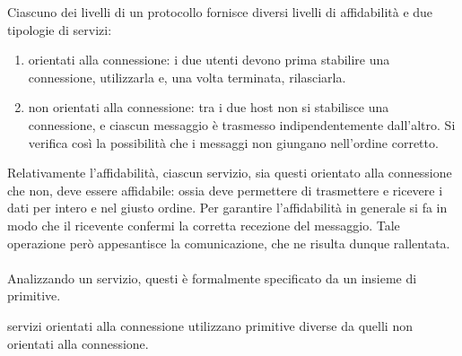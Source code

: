 \documentclass{subfiles}
\begin{document}
Ciascuno dei livelli di un protocollo fornisce diversi livelli di affidabilità e due tipologie di servizi:
\begin{enumerate}
    \item orientati alla connessione: i due utenti devono prima stabilire una connessione, utilizzarla e, una volta terminata, rilasciarla.

    \item non orientati alla connessione: tra i due host non si stabilisce una connessione, e ciascun messaggio è trasmesso indipendentemente dall'altro.
          Si verifica così la possibilità che i messaggi non giungano nell'ordine corretto.
\end{enumerate}

Relativamente l'affidabilità, ciascun servizio, sia questi orientato alla connessione che non, deve essere affidabile:
ossia deve permettere di trasmettere e ricevere i dati per intero e nel giusto ordine.
Per garantire l'affidabilità in generale si fa in modo che il ricevente confermi la corretta recezione del messaggio.
Tale operazione però appesantisce la comunicazione, che ne risulta dunque rallentata.
\\ \\
Analizzando un servizio, questi è formalmente specificato da un insieme di primitive.
\begin{Note*}
    servizi orientati alla connessione utilizzano primitive diverse da quelli non orientati alla connessione.
\end{Note*}
\end{document}
